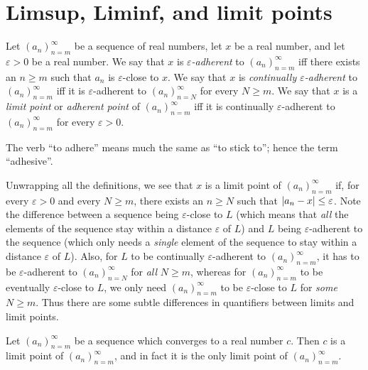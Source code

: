\section{Limsup, Liminf, and limit points}\label{sec 6.4}

\begin{definition}\label{6.4.1}
Let \((a_n)_{n = m}^\infty\) be a sequence of real numbers, let \(x\) be a real number, and let \(\varepsilon > 0\) be a real number.
We say that \(x\) is \emph{\(\varepsilon\)-adherent} to \((a_n)_{n = m}^\infty\) iff there exists an \(n \geq m\) such that \(a_n\) is \(\varepsilon\)-close to \(x\).
We say that \(x\) is \emph{continually \(\varepsilon\)-adherent} to \((a_n)_{n = m}^\infty\) iff it is \(\varepsilon\)-adherent to \((a_n)_{n = N}^\infty\) for every \(N \geq m\).
We say that \(x\) is a \emph{limit point} or \emph{adherent point} of \((a_n)_{n = m}^\infty\) iff it is continually \(\varepsilon\)-adherent to \((a_n)_{n = m}^\infty\) for every \(\varepsilon > 0\).
\end{definition}

\begin{remark}\label{6.4.2}
The verb ``to adhere'' means much the same as ``to stick to'';
hence the term ``adhesive''.
\end{remark}

\begin{note}
Unwrapping all the definitions, we see that \(x\) is a limit point of \((a_n)_{n = m}^\infty\) if, for every \(\varepsilon > 0\) and every \(N \geq m\), there exists an \(n \geq N\) such that \(\abs*{a_n - x} \leq \varepsilon\).
Note the difference between a sequence being \(\varepsilon\)-close to \(L\)
(which means that \emph{all} the elements of the sequence stay within a distance \(\varepsilon\) of \(L\))
and \(L\) being \(\varepsilon\)-adherent to the sequence
(which only needs a \emph{single} element of the sequence to stay within a distance \(\varepsilon\) of \(L\)).
Also, for \(L\) to be continually \(\varepsilon\)-adherent to \((a_n)_{n = m}^\infty\), it has to be \(\varepsilon\)-adherent to \((a_n)_{n = N}^\infty\) for \emph{all} \(N \geq m\), whereas for \((a_n)_{n = m}^\infty\) to be eventually \(\varepsilon\)-close to \(L\), we only need \((a_n)_{n = m}^\infty\) to be \(\varepsilon\)-close to \(L\) for \emph{some} \(N \geq m\).
Thus there are some subtle differences in quantifiers between limits and limit points.
\end{note}

\setcounter{theorem}{4}
\begin{proposition}\label{6.4.5}
Let \((a_n)_{n = m}^\infty\) be a sequence which converges to a real number \(c\).
Then \(c\) is a limit point of \((a_n)_{n = m}^\infty\), and in fact it is the only limit point of \((a_n)_{n = m}^\infty\).
\end{proposition}

